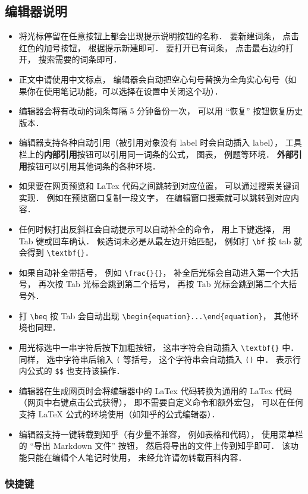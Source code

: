 \subsection{编辑器说明}
\begin{itemize}
\item 将光标停留在任意按钮上都会出现提示说明按钮的名称． 要新建词条， 点击红色的加号按钮， 根据提示新建即可． 要打开已有词条， 点击最右边的打开， 搜索需要的词条即可．
\item 正文中请使用中文标点， 编辑器会自动把空心句号替换为全角实心句号（如果你在使用笔记功能，可以选择在设置中关闭这个功）．
\item 编辑器会将有改动的词条每隔 5 分钟备份一次， 可以用 “恢复” 按钮恢复历史版本．
\item 编辑器支持各种自动引用（被引用对象没有 label 时会自动插入 label）， 工具栏上的\textbf{内部引用}按钮可以引用同一词条的公式， 图表， 例题等环境． \textbf{外部引用}按钮可以引用其他词条的各种环境．
\item 如果要在网页预览和 LaTex 代码之间跳转到对应位置， 可以通过搜索关键词实现． 例如在预览窗口复制一段文字， 在编辑窗口搜索就可以跳转到对应内容．
\item 任何时候打出反斜杠会自动提示可以自动补全的命令， 用上下键选择， 用 Tab 键或回车确认． 候选词未必是从最左边开始匹配， 例如打 \verb|\bf| 按 tab 就会得到 \verb|\textbf{}|．
\item 如果自动补全带括号， 例如 \verb|\frac{}{}|， 补全后光标会自动进入第一个大括号， 再次按 Tab 光标会跳到第二个括号， 再按 Tab 光标会跳到第二个大括号外．
\item 打 \verb|\beq| 按 Tab 会自动出现 \verb|\begin{equation}...\end{equation}|， 其他环境也同理．
\item 用光标选中一串字符后按下加粗按钮， 这串字符会自动插入 \verb|\textbf{}| 中． 同样， 选中字符串后输入 \verb|(| 等括号， 这个字符串会自动插入 \verb|()| 中． 表示行内公式的 \verb|$$| 也支持该操作．
\item 编辑器在生成网页时会将编辑器中的 LaTex 代码转换为通用的 LaTex 代码（网页中右键点击公式获得）， 即不需要自定义命令和额外宏包， 可以在任何支持 LaTeX 公式的环境使用（如知乎的公式编辑器）．
\item 编辑器支持一键转载到知乎（有少量不兼容， 例如表格和代码）， 使用菜单栏的 “导出 Markdown 文件” 按钮， 然后将导出的文件上传到知乎即可． 该功能只能在编辑个人笔记时使用， 未经允许请勿转载百科内容．
\end{itemize}

\subsubsection{快捷键}

